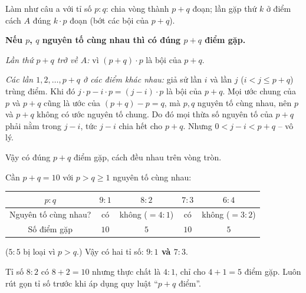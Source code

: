 {
Làm như câu a với tỉ số $p:q$: chia vòng thành $p+q$ đoạn; lần gặp thứ $k$ ở điểm cách $A$ đúng $k\cdot p$ đoạn (bớt các bội của $p+q$).
\begin{proofbox}\textbf{Nếu $p$, $q$ nguyên tố cùng nhau thì có đúng $p+q$ điểm gặp.}\par
\emph{Lần thứ $p+q$ trở về $A$:} vì $(p+q)\cdot p$ là bội của $p+q$.\par
\emph{Các lần $1,2,\dots,p+q$ ở các điểm khác nhau:} giả sử lần $i$ và lần $j$ ($i<j\le p+q$) trùng điểm. Khi đó $j\cdot p-i\cdot p=(j-i)\cdot p$ là bội của $p+q$. Mọi ước chung của $p$ và $p+q$ cũng là ước của $(p+q)-p=q$, mà $p,q$ nguyên tố cùng nhau, nên $p$ và $p+q$ không có ước nguyên tố chung. Do đó mọi thừa số nguyên tố của $p+q$ phải nằm trong $j-i$, tức $j-i$ chia hết cho $p+q$. Nhưng $0<j-i<p+q$ -- vô lý.\par
Vậy có đúng $p+q$ điểm gặp, cách đều nhau trên vòng tròn.\end{proofbox}
Cần $p+q=10$ với $p>q\ge 1$ nguyên tố cùng nhau:
\begin{center}
\begin{tabular}{|c|c|c|c|c|}
\hline
\rowcolor{tmBlue!10}$p:q$ & $9:1$ & $8:2$ & $7:3$ & $6:4$\\ \hline
Nguyên tố cùng nhau? & có & không ($=4:1$) & có & không ($=3:2$)\\ \hline
Số điểm gặp & $10$ & $5$ & $10$ & $5$\\ \hline
\end{tabular}
\end{center}
($5:5$ bị loại vì $p>q$.) Vậy có hai tỉ số: \textbf{$9:1$ và $7:3$}.
\begin{warnbox}Tỉ số $8:2$ có $8+2=10$ nhưng thực chất là $4:1$, chỉ cho $4+1=5$ điểm gặp. Luôn rút gọn tỉ số trước khi áp dụng quy luật ``$p+q$ điểm''.\end{warnbox}
}

